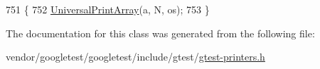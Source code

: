 \begin{DoxyCode}
751                                                      \{
752     \hyperlink{namespacetesting_1_1internal_a73b5046a2ed65d0e2fb7cdc9bdaee3fe}{UniversalPrintArray}(a, N, os);
753   \}
\end{DoxyCode}


The documentation for this class was generated from the following file\+:\begin{DoxyCompactItemize}
\item 
vendor/googletest/googletest/include/gtest/\hyperlink{gtest-printers_8h}{gtest-\/printers.\+h}\end{DoxyCompactItemize}
